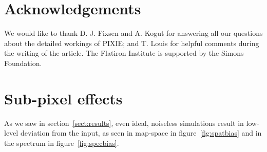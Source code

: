 \documentclass{article}
\begin{document}
\section*{Acknowledgements}
We would like to thank D. J. Fixsen and A. Kogut for answering all our questions
about the detailed workings of PIXIE; and T. Louis for helpful comments
during the writing of the article. The Flatiron Institute is supported by the
Simons Foundation.




\pagebreak

\appendix

\section{Sub-pixel effects}
\label{sect:subpix}
As we saw in section~\ref{sect:results}, even ideal, noiseless
simulations result in low-level deviation from the input, as
seen in map-space in figure~\ref{fig:spatbias} and in the
spectrum in figure~\ref{fig:specbias}.
\end{document}
